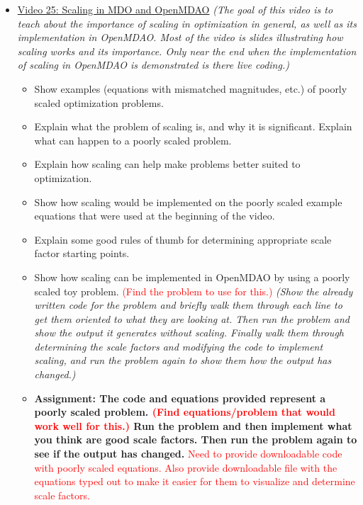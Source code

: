 \documentclass[12pt, letterpaper]{article}
\begin{document}
\begin{itemize}
	\item \underline{Video 25: Scaling in MDO and OpenMDAO} \textit{(The goal of this video is to teach about the importance of scaling in optimization in general, as well as its implementation in OpenMDAO. Most of the video is slides illustrating how scaling works and its importance. Only near the end when the implementation of scaling in OpenMDAO is demonstrated is there live coding.)}
		\begin{itemize}
			\item Show examples (equations with mismatched magnitudes, etc.) of poorly scaled optimization problems.
			\item Explain what the problem of scaling is, and why it is significant. Explain what can happen to a poorly scaled problem.
			\item Explain how scaling can help make problems better suited to optimization.
			\item Show how scaling would be implemented on the poorly scaled example equations that were used at the beginning of the video.
			\item Explain some good rules of thumb for determining appropriate scale factor starting points.
			\item Show how scaling can be implemented in OpenMDAO by using a poorly scaled toy problem. \textcolor{red}{(Find the problem to use for this.)} \textit{(Show the already written code for the problem and briefly walk them through each line to get them oriented to what they are looking at. Then run the problem and show the output it generates without scaling. Finally walk them through determining the scale factors and modifying the code to implement scaling, and run the problem again to show them how the output has changed.)}
			\item \textbf{Assignment: The code and equations provided represent a poorly scaled problem. \textcolor{red}{(Find equations/problem that would work well for this.)} Run the problem and then implement what you think are good scale factors. Then run the problem again to see if the output has changed.} \textcolor{red}{Need to provide downloadable code with poorly scaled equations. Also provide downloadable file with the equations typed out to make it easier for them to visualize and determine scale factors.}
		\end{itemize}
		

\end{itemize}
\end{document}
